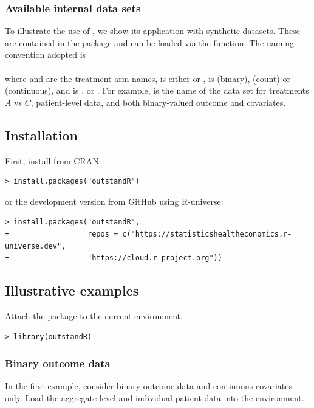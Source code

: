 \documentclass[article]{jss}
\begin{document}
\subsubsection{Available internal data sets}
To illustrate the use of , we show its application with synthetic datasets. These are contained in the  package and can be loaded via the  function. The naming convention adopted is \newline \\
 \newline
\\
where  and  are the treatment arm names,  is either  or ,  is  (binary),  (count) or  (continuous), and  is ,  or . For example,  is the name of the data set for treatments $A$ vs $C$, patient-level data, and both binary-valued outcome and covariates.

\subsection{Installation}
First, install  from CRAN: 

\begin{verbatim}
> install.packages("outstandR")
\end{verbatim}
or the development version from GitHub using R-universe:
\begin{verbatim}
> install.packages("outstandR",
+                  repos = c("https://statisticshealtheconomics.r-universe.dev",
+                  "https://cloud.r-project.org"))
\end{verbatim}


\subsection{Illustrative examples}
Attach the package to the current environment.

\begin{verbatim}
> library(outstandR)
\end{verbatim}

%
\subsubsection{Binary outcome data}
In the first example, consider binary outcome data and continuous covariates only.
Load the aggregate level and individual-patient data into the environment.
\end{document}
